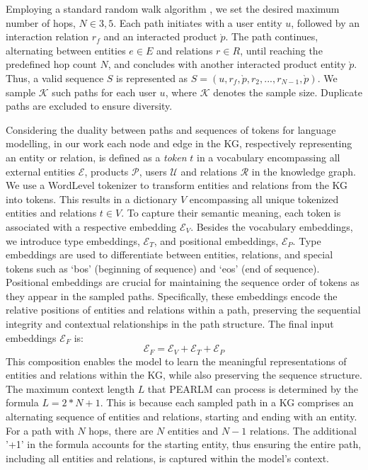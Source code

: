 \documentclass[sigconf]{acmart}
\begin{document}
Employing a standard random walk algorithm \cite{li2015random}, we set the desired maximum number of hops, $N \in {3,5}$. Each path initiates with a user entity $u$, followed by an interaction relation $r_f$ and an interacted product $\grave{p}$. The path continues, alternating between entities $e \in E$ and relations $r \in R$, until reaching the predefined hop count $N$, and concludes with another interacted product entity $\grave{p}$. Thus, a valid sequence $S$ is represented as $S = (u, r_f, \grave{p}, r_2, ..., r_{N-1}, \grave{p})$. We sample $\mathcal{K}$ such paths for each user $u$, where $\mathcal{K}$ denotes the sample size. Duplicate paths are excluded to ensure diversity.


Considering the duality between paths and sequences of tokens for language modelling, in our work each node and edge in the KG, respectively representing an entity or relation, is defined as a \emph{token} $t$ in a vocabulary encompassing all external entities $\mathcal{E}$, products $\mathcal{P}$, users $\mathcal{U}$ and relations $\mathcal{R}$ in the knowledge graph. 
We use a WordLevel tokenizer to transform entities and relations from the KG into tokens. This results in a dictionary $V$ encompassing all unique tokenized entities and relations $t \in V$.
To capture their semantic meaning, each token is associated with a respective embedding $\mathcal{E}_{V}$.
Besides the vocabulary embeddings, we introduce type embeddings, $\mathcal{E}_{T}$, and positional embeddings, $\mathcal{E}_{P}$. Type embeddings are used to differentiate between entities, relations, and special tokens such as `bos' (beginning of sequence) and `eos' (end of sequence). Positional embeddings are crucial for maintaining the sequence order of tokens as they appear in the sampled paths. Specifically, these embeddings encode the relative positions of entities and relations within a path, preserving the sequential integrity and contextual relationships in the path structure.
The final input embeddings $\mathcal{E}_{F}$ is:
\begin{equation}
\mathcal{E}_{F} = \mathcal{E}_{V} + \mathcal{E}_{T} + \mathcal{E}_{P}
\end{equation}
This composition enables the model to learn the meaningful representations of entities and relations within the KG, while also preserving the sequence structure.
The maximum context length \( L \) that PEARLM can process is determined by the formula \( L = 2 * N + 1 \). This is because each sampled path in a KG comprises an alternating sequence of entities and relations, starting and ending with an entity. For a path with \( N \) hops, there are \( N \) entities and \( N-1 \) relations. The additional '+1' in the formula accounts for the starting entity, thus ensuring the entire path, including all entities and relations, is captured within the model's context.
\end{document}
